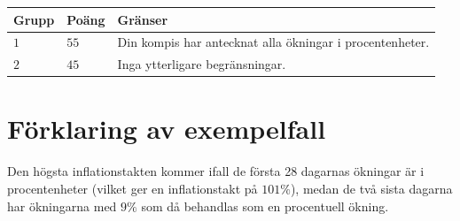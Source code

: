\noindent
\begin{tabular}{| l | l | p{12cm} |}
  \hline
  \textbf{Grupp} & \textbf{Poäng} & \textbf{Gränser} \\ \hline
  $1$    & $55$      & Din kompis har antecknat alla ökningar i procentenheter. \\ \hline
  $2$    & $45$      & Inga ytterligare begränsningar. \\ \hline
\end{tabular}

\section*{Förklaring av exempelfall}
Den högsta inflationstakten kommer ifall de första 28 dagarnas ökningar är i procentenheter (vilket ger en inflationstakt på $101\%$), medan de två sista dagarna har ökningarna med $9\%$ som då behandlas som en procentuell ökning.
